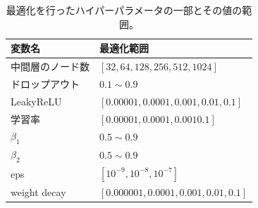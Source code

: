 \begin{table}[H]
\centering
 \begin{tabular}{ l  l }
 \hline
 変数名 & 最適化範囲\\
 \hline
 \hline
 中間層のノード数 & $[32, 64, 128, 256, 512, 1024]$\\
 ドロップアウト & $0.1 \sim 0.9$\\
 LeakyReLU & $[0.00001, 0.0001, 0.001, 0.01, 0.1]$\\
 学習率 & $[0.00001, 0.0001, 0.001 0.1]$\\
 $\beta_1$ & $0.5 \sim 0.9$\\ 
 $\beta_2$ & $0.5 \sim 0.9$\\ 
 eps & $[10^{-9}, 10^{-8}, 10^{-7}]$\\
 weight decay & $[0.000001, 0.0001, 0.001, 0.01, 0.1]$\\
  \hline
 \end{tabular}
 \label{dnnoptuna}
 \caption{最適化を行ったハイパーパラメータの一部とその値の範囲。}
\end{table}


